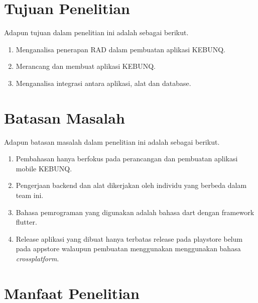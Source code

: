 \begin{flushleft}
\begin{enumerate}
  
\end{enumerate}
\vspace{2cm}

\section{Tujuan Penelitian}

\begin{justify}
  Adapun tujuan dalam penelitian ini adalah sebagai berikut.


\end{justify}
\begin{enumerate}
  \item Menganalisa penerapan RAD dalam pembuatan aplikasi KEBUNQ.
  \item Merancang dan membuat aplikasi KEBUNQ.
  \item Menganalisa integrasi antara aplikasi, alat dan database.
  \end{enumerate}
\vspace{2cm}

\section{Batasan Masalah}

\begin{justify}
  Adapun batasan masalah dalam penelitian ini adalah sebagai berikut.


\end{justify}
\begin{enumerate}
  \item Pembahasan hanya berfokus pada perancangan dan pembuatan aplikasi mobile KEBUNQ.
  \item Pengerjaan backend dan alat dikerjakan oleh individu yang berbeda dalam team ini.
  \item Bahasa pemrograman yang digunakan adalah bahasa dart dengan framework flutter.
  \item Release aplikasi yang dibuat hanya terbatas release pada playstore belum pada appstore walaupun pembuatan menggunakan menggunakan bahasa \textit{crossplatform}.

  \end{enumerate}
\vspace{2cm}


\section{Manfaat Penelitian}


\end{flushleft}
